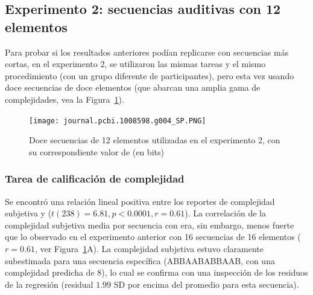 \subsection{Experimento 2: secuencias auditivas con 12 elementos}
\label{BIN:EXP2:Results}


Para probar si los resultados anteriores podían replicarse con secuencias más cortas, en el experimento 2, se utilizaron las mismas tareas y el mismo procedimiento (con un grupo diferente de participantes), pero esta vez usando doce secuencias de doce elementos (que abarcan una amplia gama de complejidades, vea la Figura~\ref{PlosBIO-F4}).

\begin{figure}[t!]
   \texttt{[image: journal.pcbi.1008598.g004\_SP.PNG]}
   \centering
   \caption{Doce secuencias de 12 elementos utilizadas en el experimento 2, con su correspondiente valor de \mdlbin (en bits)}
   \label{PlosBIO-F4}
\end{figure}

\subsubsection*{Tarea de calificación de complejidad}


Se encontró una relación lineal positiva entre los reportes de complejidad subjetiva y \mdlbin ($t(238) = 6.81, p < 0.0001, r = 0.61$). La correlación de la complejidad subjetiva media por secuencia con \mdlbin era, sin embargo, menos fuerte que lo observado en el experimento anterior con 16 secuencias de 16 elementos ($r = 0.61$, ver Figura~\ref{PlosBIO-F4}A). La complejidad subjetiva estuvo claramente subestimada para una secuencia específica (ABBAABABBAAB, con una complejidad predicha de 8), lo cual se confirma con una inspección de los residuos de la regresión (residual $1.99$ SD por encima del promedio para esta secuencia).

